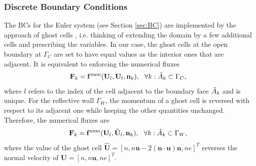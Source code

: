 \documentclass{article}
\begin{document}
\subsubsection{Discrete Boundary Conditions}
The BCs for the Euler system (see Section \ref{sec:BC}) are implemented by the approach of ghost cells \cite[][ch. 7]{leveque_2007}, i.e. thinking of extending the domain by a few additional cells and prescribing the variables. In our case, the ghost cells at the open boundary at $\Gamma_C$ are set to have equal values as the interior ones that are adjacent. It is equivalent to enforcing the numerical fluxes
\begin{equation*}
    \mathbf{F}_k = {\mathbf{f}^\text{num}}(\mathbf{U}_l, \mathbf{U}_l, \mathbf{n}_k), \ \ \forall k: \Tilde{A}_k \subset \Gamma_C,
\end{equation*}
where $l$ refers to the index of the cell adjacent to the boundary face $\Tilde{A}_k$ and is unique. For the reflective wall $\Gamma_W$, the momentum of a ghost cell is reversed with respect to its adjacent one while keeping the other quantities unchanged. Therefore, the numerical fluxes are 
\begin{equation*}
    \mathbf{F}_k = \mathbf{f}^\text{num}(\mathbf{U}_l, \hat{\mathbf{U}}_l, \mathbf{n}_k), \ \ \forall k: \Tilde{A}_k \subset \Gamma_W,
\end{equation*}
where the value of the ghost cell $\hat{\mathbf{U}} = [n, n\mathbf{u} - 2(\mathbf{n}\cdot\mathbf{u})\mathbf{n}, ne]^T$ reverses the normal velocity of $\mathbf{U} = [n, n\mathbf{u}, ne]^T$. 
\end{document}
